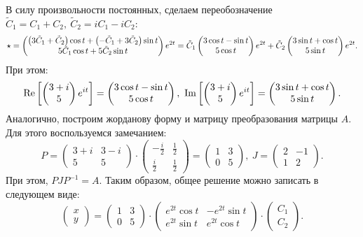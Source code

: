 		В силу произвольности постоянных, сделаем переобозначение \( \tilde{C}_1 = C_1 + C_2, ~ \tilde{C}_2 = iC_1 - iC_2 \):
		\[ \star = \begin{pmatrix} \left( 3\tilde{C}_1 + \tilde{C}_2 \right) \cos{t} + \left( -\tilde{C}_1 + 3\tilde{C}_2 \right) \sin{t} \\ 5\tilde{C}_1 \cos{t} + 5\tilde{C}_2 \sin{t} \end{pmatrix} e^{2t} = \tilde{C}_1 \begin{pmatrix} 3\cos{t} - \sin{t} \\5 \cos{t} \end{pmatrix} e^{2t} + \tilde{C}_2 \begin{pmatrix} 3\sin{t} + \cos{t} \\5 \sin{t} \end{pmatrix} e^{2t}. \]
		При этом:
		\[ \operatorname{Re}\left[ \begin{pmatrix} 3 + i \\ 5 \end{pmatrix} e^{it} \right] = \begin{pmatrix} 3\cos{t} - \sin{t} \\5 \cos{t} \end{pmatrix}, ~ \operatorname{Im}\left[ \begin{pmatrix} 3 + i \\ 5 \end{pmatrix} e^{it} \right] = \begin{pmatrix} 3\sin{t} + \cos{t} \\5 \sin{t} \end{pmatrix}. \]
		Аналогично, построим жорданову форму и матрицу преобразования матрицы $A$. Для этого воспользуемся замечанием:
		\[ P = \begin{pmatrix} 3 + i & 3 - i \\ 5 & 5 \end{pmatrix} \cdot \begin{pmatrix} -\frac{i}{2} & \frac{1}{2} \\ \frac{i}{2} & \frac{1}{2} \end{pmatrix} = \begin{pmatrix} 1 & 3 \\ 0 & 5 \end{pmatrix}, ~ J = \begin{pmatrix} 2 & -1 \\ 1 & 2 \end{pmatrix}. \]
		При этом, $PJP^{-1} = A$. Таким образом, общее решение можно записать в следующем виде:
		\[ \begin{pmatrix} x \\ y \end{pmatrix} = \begin{pmatrix} 1 & 3 \\ 0 & 5 \end{pmatrix} \cdot \begin{pmatrix} e^{2t}\cos{t} & -e^{2t}\sin{t} \\ e^{2t}\sin{t} & e^{2t}\cos{t} \end{pmatrix} \cdot \begin{pmatrix} C_1 \\ C_2 \end{pmatrix}. \]

